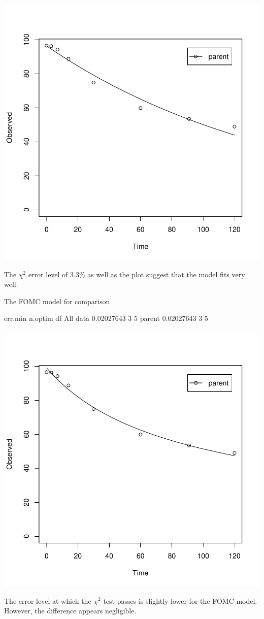 \documentclass[12pt,a4paper]{article}
\begin{document}
\includegraphics{examples-L4_SFO}

The $\chi^2$ error level of 3.3\% as well as the plot suggest that the model
fits very well. 

The FOMC model for comparison

\begin{Schunk}
\begin{Soutput}
            err.min n.optim df
All data 0.02027643       3  5
parent   0.02027643       3  5
\end{Soutput}
\end{Schunk}
\includegraphics{examples-L4_FOMC}

The error level at which the $\chi^2$ test passes is slightly lower for the FOMC 
model. However, the difference appears negligible.



\end{document}
